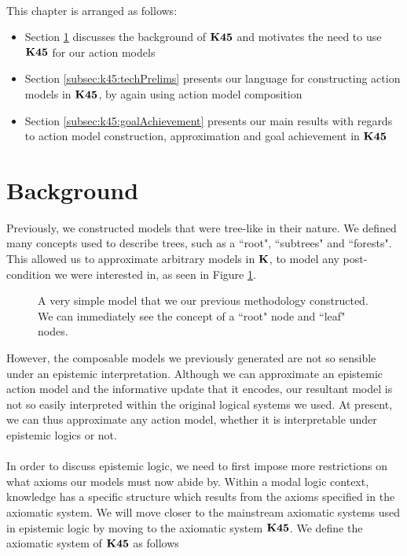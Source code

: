 \\
This chapter is arranged as follows:
\begin{itemize}
	\item Section \ref{subsec:k45:background} discusses the background of $\bf K45$ and motivates the
		need to use $\bf K45$ for our action models
	\item Section \ref{subsec:k45:techPrelims} presents our language for constructing action models in
		$\bf K45$, by again using action model composition
	\item Section \ref{subsec:k45:goalAchievement} presents our main results with
  regards to action
		model construction, approximation and goal achievement in $\bf K45$
\end{itemize}

\section{Background} \label{subsec:k45:background}

Previously, we constructed models that were tree-like in their nature.
We defined many concepts used to describe trees, such as a ``root", ``subtrees" and ``forests".
This allowed us to approximate arbitrary models in $\AXK$, to model any post-condition we
were interested in, as seen in Figure \ref{exampleModelConstruct}.

\begin{figure}
\centering
{}
\caption[Example of constructions in $\AXK$]{A very simple model that we our previous methodology constructed.
We can immediately see the concept of a ``root" node and ``leaf" nodes.}
\label{exampleModelConstruct}
\end{figure}

However, the composable models we previously generated are not so sensible under an epistemic interpretation.
Although we can approximate an epistemic action model and the informative update that it
encodes, our resultant model is not so easily interpreted within the original logical systems we
used.
At present, we can thus approximate any action model, whether it is interpretable under epistemic
logics or not.\\
\\
In order to discuss epistemic logic, we need to first impose more restrictions on what axioms our
models must now abide by.
Within a modal logic context, knowledge has a specific structure which results from the axioms
specified in the axiomatic system.
We will move closer to the mainstream axiomatic systems used in epistemic logic by moving to the
axiomatic system $\bf K45$.
We define the axiomatic system of $\bf K45$ as follows

